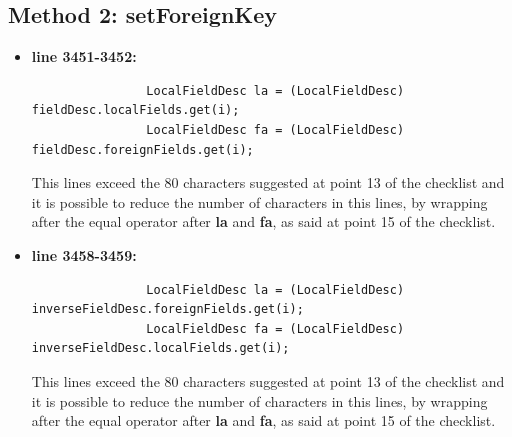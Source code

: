 \documentclass[18pt,oneside,a4paper, titlepage]{article}
\begin{document}
		\subsection{Method 2: setForeignKey}
			\begin{itemize}
				\item \textbf{line 3451-3452:} \begin{lstlisting}
				LocalFieldDesc la = (LocalFieldDesc) fieldDesc.localFields.get(i);
				LocalFieldDesc fa = (LocalFieldDesc) fieldDesc.foreignFields.get(i);
				\end{lstlisting}
				\vspace{0.1cm}
				This lines exceed the 80 characters suggested at point 13 of the checklist and it is possible to reduce the number of characters in this lines, by wrapping after the equal operator after \textbf{la} and \textbf{fa}, as said at point 15 of the checklist.
				\item \textbf{line 3458-3459:} \begin{lstlisting}
				LocalFieldDesc la = (LocalFieldDesc) inverseFieldDesc.foreignFields.get(i);
				LocalFieldDesc fa = (LocalFieldDesc) inverseFieldDesc.localFields.get(i);
				\end{lstlisting}
				\vspace{0.1cm}
				This lines exceed the 80 characters suggested at point 13 of the checklist and it is possible to reduce the number of characters in this lines, by wrapping after the equal operator after \textbf{la} and \textbf{fa}, as said at point 15 of the checklist.
			\end{itemize}
\end{document}
